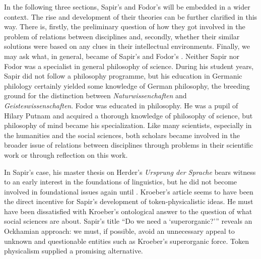 \documentclass[output=paper]{langscibook}
\begin{document}
In the following three sections, Sapir's and Fodor's  will be embedded in a wider context. The rise and development of their theories can be further clarified in this way. There is, firstly, the preliminary question of how they got involved in the problem of relations between disciplines and, secondly, whether their similar solutions were based on any clues in their intellectual environments. Finally, we may ask what, in general, became of Sapir's and Fodor's . Neither Sapir nor Fodor was a specialist in general philosophy of science. During his student years, Sapir did not follow a philosophy programme, but his education in Germanic philology certainly yielded some knowledge of German philosophy, the breeding ground for the distinction between \emph{Naturwissenchaften} and \emph{Geisteswissenschaften}. Fodor was educated in philosophy. He was a pupil of Hilary Putnam and acquired a thorough knowledge of philosophy of science, but philosophy of mind became his specialization. Like many scientists, especially in the humanities and the social sciences, both scholars became involved in the broader issue of relations between disciplines through problems in their scientific work or through reflection on this work.

In Sapir's case, his master thesis on Herder's \emph{Ursprung der Sprache} \citep{Sapir1907} bears witness to an early interest in the foundations of linguistics, but he did not become involved in foundational issues again until \citeyear{Sapir1917}. Kroeber's article seems to have been the direct incentive for Sapir's development of token-physicalistic ideas. He must have been dissatisfied with Kroeber's ontological answer to the question of what social sciences are about. Sapir's title ``Do we need a `superorganic?'\thinspace'' reveals an Ockhamian approach: we must, if possible, avoid an unnecessary appeal to unknown and questionable entities such as Kroeber's superorganic force. Token physicalism supplied a promising alternative.
\end{document}
